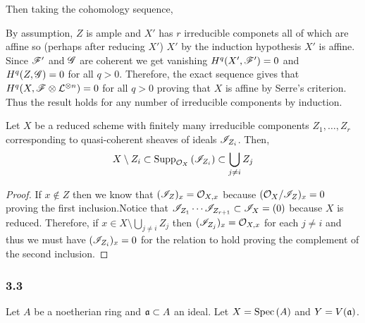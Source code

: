 \documentclass[12pt]{article}
\begin{document}
Then taking the cohomology sequence,
\begin{center}
\end{center}
By assumption, $Z$ is ample and $X'$ has $r$ irreducible componets all of which are affine so (perhaps after reducing $X'$) $X'$ by the induction hypothesis $X'$ is affine. Since $\mathscr{F}'$ and $\mathscr{G}$ are coherent we get vanishing $H^q(X', \mathscr{F}') = 0$ and $H^q(Z, \mathscr{G}) = 0$ for all $q > 0$.
Therefore, the exact sequence gives that $H^q(X, \mathscr{F} \otimes \mathcal{L}^{\otimes n}) = 0$ for all $q > 0$ proving that $X$ is affine by Serre's criterion. Thus the result holds for any number of irreducible components by induction.

\begin{lemma} \label{support_component_sheaf_ideal}
Let $X$ be a reduced scheme with finitely many irreducible components $Z_1, \dots, Z_r$ corresponding to quasi-coherent sheaves of ideals $\mathscr{I}_{Z_i}$. Then,
\[ X \setminus Z_i \subset \mathrm{Supp}_{\mathcal{O}_{X}}\left(\mathscr{I}_{Z_{i}} \right) \subset \bigcup_{j \neq i} Z_j \]
\end{lemma}

\begin{proof}
If $x \notin Z$ then we know that $(\mathscr{I}_Z)_x = \mathcal{O}_{X, x}$ because $(\mathcal{O}_{X}/\mathscr{I}_Z)_x = 0$ proving the first inclusion.Notice that $\mathscr{I}_{Z_1} \cdots \mathscr{I}_{Z_{r+1}} \subset \mathscr{I}_{X} = (0)$ because $X$ is reduced. Therefore, if $x \in X \setminus \bigcup_{j \neq i} Z_j$ then $(\mathscr{I}_{Z_j})_x = \mathcal{O}_{X, x}$ for each $j \neq i$ and thus we must have $(\mathscr{I}_{Z_i})_x = 0$ for the relation to hold proving the complement of the second inclusion.
\end{proof}

\subsubsection{3.3}

Let $A$ be a noetherian ring and $\mathfrak{a} \subset A$ an ideal. Let $X = \mathrm{Spec}\left( A \right)$ and $Y = V(\mathfrak{a})$.  
\end{document}
